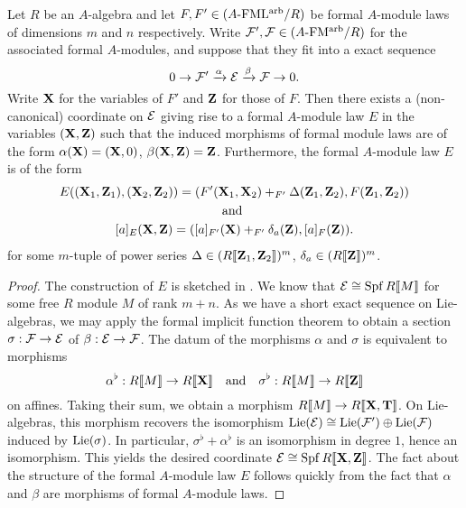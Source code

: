 \documentclass[../main.tex]{subfiles}
\begin{document}
\begin{lem}\label{lem:SESStandardForm}
  Let $R$ be an $A$-algebra and let $F, F' \in {({A}\text-\mathrm{FML^{arb}}/{R})}$ be 
  formal $A$-module laws of dimensions $m$ and $n$ respectively. Write 
  $\mathcal{F}', \mathcal{F} \in {({A}\text-\mathrm{FM^{arb}}/{R})}$ for the associated formal $A$-modules,
  and suppose that they fit into a exact sequence
  \begin{equation*}
    0 \to \mathcal{F}' \xrightarrow{\alpha} \mathcal{E} \xrightarrow{\beta} \mathcal{F} \to 0.
  \end{equation*}
  Write $\mathbf{X}$ for the variables of $F'$ and $\mathbf{Z}$ for those of $F$. Then 
  there exists a (non-canonical) coordinate on $\mathcal{E}$ giving rise to a formal
  $A$-module law $E$ in the variables $(\mathbf{X}, \mathbf{Z})$ such that the induced morphisms
  of formal module laws are of the form 
  $\alpha(\mathbf{X}) = (\mathbf{X}, 0)$, $\beta(\mathbf{X}, \mathbf{Z}) = \mathbf{Z}$. Furthermore, 
  the formal $A$-module law $E$ is of the form
  \begin{equation}\label{eq:SESStandardFormModuleLaw}
  \begin{gathered}
    E((\mathbf{X}_1, \mathbf{Z}_1), (\mathbf{X}_2, \mathbf{Z}_2)) = (F'(\mathbf{X}_1, \mathbf{X}_2) +_{F'} \Delta(\mathbf{Z}_1,
    \mathbf{Z}_2) , F(\mathbf{Z}_1, \mathbf{Z}_2)) \\
    \text{and } \\
    [a]_E(\mathbf{X}, \mathbf{Z}) = ([a]_{F'}(\mathbf{X}) +_{F'} \delta_a(\mathbf{Z}), [a]_F(\mathbf{Z})).
  \end{gathered}
  \end{equation}
  for some $m$-tuple of power series $\Delta \in (R\llbracket \mathbf{Z}_1, \mathbf{Z}_2 \rrbracket)^m$,
  $\delta_a \in (R\llbracket \mathbf{Z} \rrbracket)^m$. 
\begin{proof}
  The construction of $E$ is sketched in \cite[Proposition
  6.5]{hopkins1994equivariant}. We know that $\mathcal{E} \cong \operatorname{Spf} R\llbracket M \rrbracket$ 
  for some free $R$ module $M$ of rank $m+n$. As we have a short 
  exact sequence on Lie-algebras, we may apply the formal implicit function
  theorem  to obtain a section 
  $\sigma: \mathcal{F} \to \mathcal{E}$ of $\beta:\mathcal{E} \to \mathcal{F}$. 
  The datum of the morphisms $\alpha$ and $\sigma$ is equivalent to 
  morphisms
  \begin{equation*}
    \alpha^\flat: R \llbracket M \rrbracket \to R \llbracket \mathbf{X} \rrbracket \quad \text{and} \quad
    \sigma^\flat: R \llbracket M \rrbracket \to R \llbracket \mathbf{Z} \rrbracket
  \end{equation*}
  on affines. Taking their sum, we obtain a morphism $R \llbracket M \rrbracket
  \to R\llbracket \mathbf{X}, \mathbf{T} \rrbracket$. On Lie-algebras, this morphism recovers the
  isomorphism $\operatorname{Lie}(\mathcal{E}) \cong \operatorname{Lie}(\mathcal{F}') \oplus \operatorname{Lie}(\mathcal{F})$ induced by 
  $\operatorname{Lie}(\sigma)$. In particular, $\sigma^\flat + \alpha^\flat$ is an isomorphism
  in degree $1$, hence an isomorphism. This yields the desired
  coordinate $\mathcal{E} \cong \operatorname{Spf} R\llbracket \mathbf{X}, \mathbf{Z}\rrbracket$. The fact about the 
  structure of the formal $A$-module law $E$ follows quickly from the fact that 
  $\alpha$ and $\beta$ are morphisms of formal $A$-module laws. 
\end{proof}
\end{lem}
\end{document}
